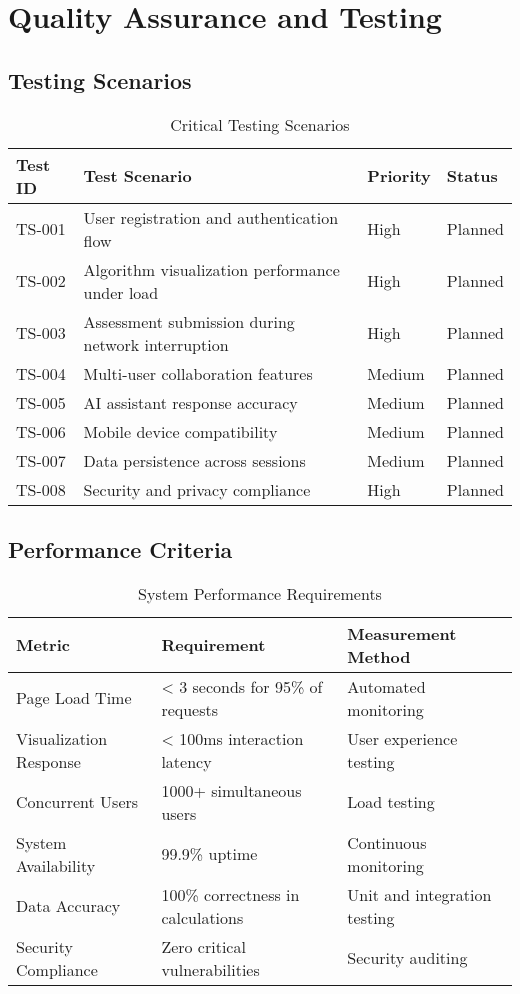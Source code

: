 \documentclass[12pt,a4paper]{article}
\begin{document}
\section{Quality Assurance and Testing}

\subsection{Testing Scenarios}

\begin{table}[H]
\centering
\caption{Critical Testing Scenarios}
\begin{tabularx}{\textwidth}{|l|X|l|l|}
\hline
\rowcolor{lightblue}
\textbf{Test ID} & \textbf{Test Scenario} & \textbf{Priority} & \textbf{Status} \\
\hline
TS-001 & User registration and authentication flow & High & Planned \\
\hline
TS-002 & Algorithm visualization performance under load & High & Planned \\
\hline
TS-003 & Assessment submission during network interruption & High & Planned \\
\hline
TS-004 & Multi-user collaboration features & Medium & Planned \\
\hline
TS-005 & AI assistant response accuracy & Medium & Planned \\
\hline
TS-006 & Mobile device compatibility & Medium & Planned \\
\hline
TS-007 & Data persistence across sessions & Medium & Planned \\
\hline
TS-008 & Security and privacy compliance & High & Planned \\
\hline
\end{tabularx}
\end{table}

\subsection{Performance Criteria}

\begin{table}[H]
\centering
\caption{System Performance Requirements}
\begin{tabularx}{\textwidth}{|l|X|l|}
\hline
\rowcolor{lightblue}
\textbf{Metric} & \textbf{Requirement} & \textbf{Measurement Method} \\
\hline
Page Load Time & < 3 seconds for 95\% of requests & Automated monitoring \\
\hline
Visualization Response & < 100ms interaction latency & User experience testing \\
\hline
Concurrent Users & 1000+ simultaneous users & Load testing \\
\hline
System Availability & 99.9\% uptime & Continuous monitoring \\
\hline
Data Accuracy & 100\% correctness in calculations & Unit and integration testing \\
\hline
Security Compliance & Zero critical vulnerabilities & Security auditing \\
\hline
\end{tabularx}
\end{table}
\end{document}
